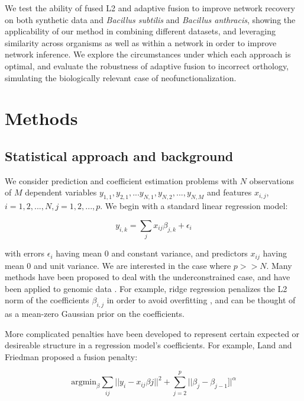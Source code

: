 \documentclass[11pt]{article}
\begin{document}
We test the ability of fused L2 and adaptive fusion to improve network recovery on both synthetic data and \textit{Bacillus subtilis} and \textit{Bacillus anthracis}, showing the applicability of our method in combining different datasets, and leveraging similarity across organisms as well as within a network in order to improve network inference. We explore the circumstances under which each approach is optimal, and evaluate the robustness of adaptive fusion to incorrect orthology, simulating the biologically relevant case of neofunctionalization. 


\section{Methods}

\subsection{Statistical approach and background}
We consider prediction and coefficient estimation problems with $N$ observations of $M$ dependent variables $y_{1,1}, y_{2,1}, ...y_{N,1}, y_{N,2},..., y_{N, M}$ and features $x_{i,j}$, $i=1,2,...,N, j=1,2,...,p$. We begin with a standard linear regression model:

\begin{equation}
y_{i,k} = \displaystyle\sum_{j}x_{ij}\beta_{j,k} + \epsilon_i
\end{equation}

with errors $\epsilon_i$ having mean 0 and constant variance, and predictors $x_{ij}$ having mean 0 and unit variance. We are interested in the case where $p >> N$. Many methods have been proposed to deal with the underconstrained case, and have been applied to genomic data \cite{waldron_optimized_2011, li_network-constrained_2008}. For example, ridge regression penalizes the L2 norm of the coefficients $\beta_{i,j}$ in order to avoid overfitting \cite{hoerl_ridge_1970}, and can be thought of as a mean-zero Gaussian prior on the coefficients. 

More complicated penalties have been developed to represent certain expected or desireable structure in a regression model's coefficients. For example, Land and Friedman \cite{citeulike3780356} proposed a fusion penalty:

\begin{equation}
\text{argmin}_{\beta} \displaystyle\sum_{ij} || y_i - x_{ij}\beta{j} ||^2 + \sum\limits_{j=2}^p ||\beta_j - \beta_{j-1}]|^\alpha
\end{equation}
\end{document}

